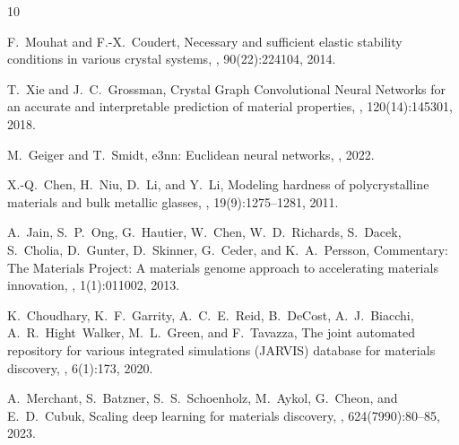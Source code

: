 \documentclass[twocolumn,10pt,aps,prb,superscriptaddress,floatfix]{revtex4-2}
\begin{document}
\begin{thebibliography}{10}

F.~Mouhat and F.-X.~Coudert,
\newblock Necessary and sufficient elastic stability conditions in various crystal systems,
, 90(22):224104, 2014.

T.~Xie and J.~C.~Grossman,
\newblock Crystal Graph Convolutional Neural Networks for an accurate and interpretable prediction of material properties,
, 120(14):145301, 2018.

M.~Geiger and T.~Smidt,
\newblock e3nn: Euclidean neural networks,
, 2022.

X.-Q.~Chen, H.~Niu, D.~Li, and Y.~Li,
\newblock Modeling hardness of polycrystalline materials and bulk metallic glasses,
, 19(9):1275--1281, 2011.

A.~Jain, S.~P.~Ong, G.~Hautier, W.~Chen, W.~D.~Richards, S.~Dacek, S.~Cholia, D.~Gunter, D.~Skinner, G.~Ceder, and K.~A.~Persson,
\newblock Commentary: The Materials Project: A materials genome approach to accelerating materials innovation,
, 1(1):011002, 2013.

K.~Choudhary, K.~F.~Garrity, A.~C.~E.~Reid, B.~DeCost, A.~J.~Biacchi, A.~R.~Hight~Walker, M.~L.~Green, and F.~Tavazza,
\newblock The joint automated repository for various integrated simulations (JARVIS) database for materials discovery,
, 6(1):173, 2020.

A.~Merchant, S.~Batzner, S.~S.~Schoenholz, M.~Aykol, G.~Cheon, and E.~D.~Cubuk,
\newblock Scaling deep learning for materials discovery,
, 624(7990):80--85, 2023.

\end{thebibliography}
\end{document}
